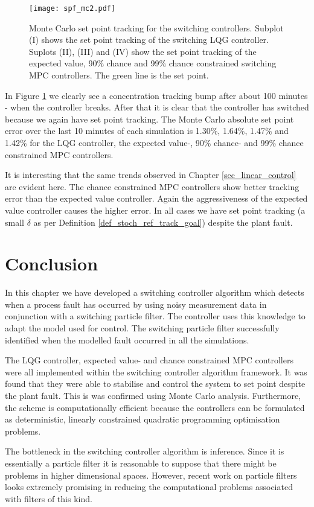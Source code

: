 \begin{figure}[H] 
\centering
\texttt{[image: spf\_mc2.pdf]}
\caption{Monte Carlo set point tracking for the switching controllers. Subplot (I) shows the set point tracking of the switching LQG controller. Suplots (II), (III) and (IV) show the set point tracking of the expected value, 90\% chance and 99\% chance constrained switching MPC controllers. The green line is the set point.}
\label{fig_spf_mc2}
\end{figure}
In Figure \ref{fig_spf_mc2} we clearly see a concentration tracking bump after about 100 minutes - when the controller breaks. After that it is clear that the controller has switched because we again have set point tracking. The Monte Carlo absolute set point error over the last 10 minutes of each simulation is 1.30\%, 1.64\%, 1.47\% and 1.42\% for the LQG controller, the expected value-, 90\% chance- and 99\% chance constrained MPC controllers. 

It is interesting that the same trends observed in Chapter \ref{sec_linear_control} are evident here. The chance constrained MPC controllers show better tracking error than the expected value controller. Again the aggressiveness of the expected value controller causes the higher error. In all cases we have set point tracking (a small $\delta$ as per Definition \ref{def_stoch_ref_track_goal}) despite the plant fault.

\section{Conclusion}
In this chapter we have developed a switching controller algorithm which detects when a process fault has occurred by using noisy measurement data in conjunction with a switching particle filter. The controller uses this knowledge to adapt the model used for control. The switching particle filter successfully identified when the modelled fault occurred in all the simulations.

The LQG controller, expected value- and chance constrained MPC controllers were all implemented within the switching controller algorithm framework. It was found that they were able to stabilise and control the system to set point despite the plant fault. This is was confirmed using Monte Carlo analysis. Furthermore, the scheme is computationally efficient because the controllers can be formulated as deterministic, linearly constrained quadratic programming optimisation problems. 

The bottleneck in the switching controller algorithm is inference. Since it is essentially a particle filter it is reasonable to suppose that there might be problems in higher dimensional spaces. However, recent work \cite{daum} on particle filters looks extremely promising in reducing the computational problems associated with filters of this kind.
